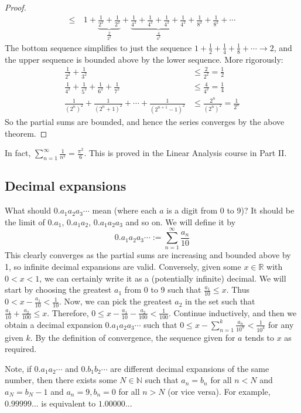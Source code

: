 \begin{proof}
\begin{align*}
		\leq\  & 1 + \underbrace{\frac 1 {2^2} + \frac 1 {2^2}}_{\frac 2 {2^2}} + \underbrace{\frac 1 {4^2} + \frac 1 {4^2} + \frac 1 {4^2} + \frac 1 {4^2}}_{\frac 4 {4^2}} + \frac 1 {8^2} + \frac 1 {8^2} + \cdots
	\end{align*}
	The bottom sequence simplifies to just the sequence \(1 + \frac{1}{2} + \frac{1}{4} + \frac{1}{8} + \cdots \to 2\), and the upper sequence is bounded above by the lower sequence.
	More rigorously:
	\begin{align*}
		\frac{1}{2^2} + \frac{1}{3^2}                                                & \leq \frac{2}{2^2} = \frac{1}{2}         \\
		\frac{1}{4^2} + \frac{1}{5^2} + \frac{1}{6^2} + \frac{1}{7^2}                & \leq \frac{4}{4^2} = \frac{1}{4}         \\
		\frac{1}{(2^n)^2} + \frac{1}{(2^n + 1)^2} + \cdots + \frac{1}{(2^{n+1}-1)^2} & \leq \frac{2^n}{(2^n)^2} = \frac{1}{2^n}
	\end{align*}
	So the partial sums are bounded, and hence the series converges by the above theorem.
\end{proof}
In fact, \(\sum_{n=1}^\infty \frac{1}{n^2} = \frac{\pi^2}{6}\).
This is proved in the Linear Analysis course in Part II.\@

\subsection{Decimal expansions}
What should \(0.a_1a_2a_3\cdots\) mean (where each \(a\) is a digit from 0 to 9)?
It should be the limit of \(0.a_1\), \(0.a_1a_2\), \(0.a_1a_2a_3\) and so on.
We will define it by
\[
	0.a_1a_2a_3\cdots := \sum_{n=1}^\infty \frac{a_n}{10}
\]
This clearly converges as the partial sums are increasing and bounded above by 1, so infinite decimal expansions are valid.
Conversely, given some \(x \in \mathbb R\) with \(0 < x < 1\), we can certainly write it as a (potentially infinite) decimal.
We will start by choosing the greatest \(a_1\) from 0 to 9 such that \(\frac{a_1}{10} \leq x\).
Thus \(0 < x - \frac{a_1}{10} < \frac{1}{10}\).
Now, we can pick the greatest \(a_2\) in the set such that \(\frac{a_1}{10} + \frac{a_2}{100} \leq x\).
Therefore, \(0 \leq x - \frac{a_1}{10} - \frac{a_2}{100} < \frac{1}{100}\).
Continue inductively, and then we obtain a decimal expansion \(0.a_1a_2a_3\cdots\) such that \(0 \leq x - \sum_{n=1}^k \frac{a_n}{10^n} < \frac{1}{10^k}\) for any given \(k\).
By the definition of convergence, the sequence given for \(a\) tends to \(x\) as required.

Note, if \(0.a_1a_2\cdots\) and \(0.b_1b_2\cdots\) are different decimal expansions of the same number, then there exists some \(N \in \mathbb N\) such that \(a_n = b_n\) for all \(n < N\) and \(a_N = b_N - 1\) and \(a_n = 9, b_n = 0\) for all \(n > N\) (or vice versa).
For example, \(0.99999\dots\) is equivalent to \(1.00000\dots\)

